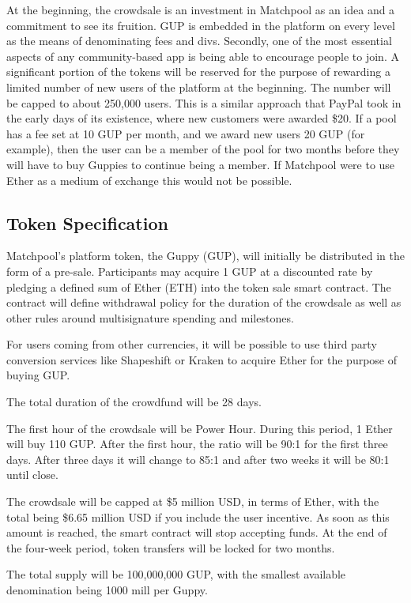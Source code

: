 \documentclass[a4paper]{article}
\begin{document}
At the beginning, the crowdsale is an investment in Matchpool as an idea and a commitment to see its fruition. GUP is embedded in the platform on every level as the means of denominating fees and divs. Secondly, one of the most essential aspects of any community-based app is being able to encourage people to join. A significant portion of the tokens will be reserved for the purpose of rewarding a limited number of new users of the platform at the beginning. The number will be capped to about 250,000 users. This is a similar approach that PayPal took in the early days of its existence, where new customers were awarded \$20. If a pool has a fee set at 10 GUP per month, and we award new users 20 GUP (for example), then the user can be a member of the pool for two months before they will have to buy Guppies to continue being a member. If Matchpool were to use Ether as a medium of exchange this would not be possible.

\subsection{Token Specification}
Matchpool’s platform token, the Guppy (GUP), will initially be distributed in the form of a pre-sale. Participants may acquire 1 GUP at a discounted rate by pledging a defined sum of Ether (ETH) into the token sale smart contract. The contract will define withdrawal policy for the duration of the crowdsale as well as other rules around multisignature spending and milestones.

For users coming from other currencies, it will be possible to use third party conversion services like Shapeshift or Kraken to acquire Ether for the purpose of buying GUP.

The total duration of the crowdfund will be 28 days.

The first hour of the crowdsale will be Power Hour. During this period, 1 Ether will buy 110 GUP. After the first hour, the ratio will be 90:1 for the first three days. After three days it will change to 85:1 and after two weeks it will be 80:1 until close.

The crowdsale will be capped at \$5 million USD, in terms of Ether, with the total being \$6.65 million USD if you include the user incentive. As soon as this amount is reached, the smart contract will stop accepting funds. At the end of the four-week period, token transfers will be locked for two months.

The total supply will be 100,000,000 GUP, with the smallest available denomination being 1000 mill per Guppy.
\end{document}

